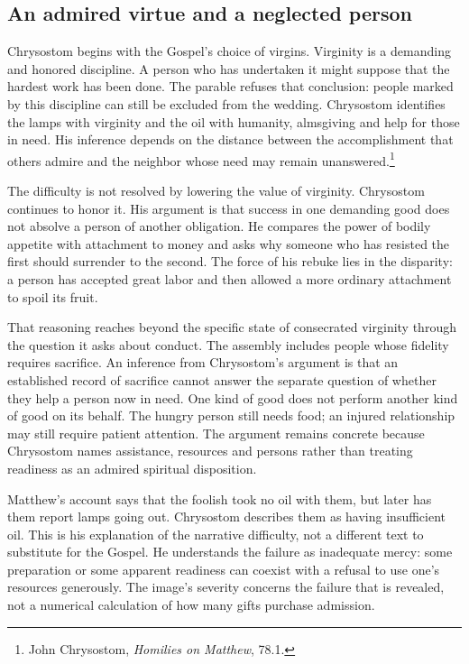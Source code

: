 \subsection{An admired virtue and a neglected person}
Chrysostom begins with the Gospel's choice of virgins. Virginity is a demanding and honored discipline. A person who has undertaken it might suppose that the hardest work has been done. The parable refuses that conclusion: people marked by this discipline can still be excluded from the wedding. Chrysostom identifies the lamps with virginity and the oil with humanity, almsgiving and help for those in need. His inference depends on the distance between the accomplishment that others admire and the neighbor whose need may remain unanswered.\footnote{John Chrysostom, \textit{Homilies on Matthew}, 78.1.}

The difficulty is not resolved by lowering the value of virginity. Chrysostom continues to honor it. His argument is that success in one demanding good does not absolve a person of another obligation. He compares the power of bodily appetite with attachment to money and asks why someone who has resisted the first should surrender to the second. The force of his rebuke lies in the disparity: a person has accepted great labor and then allowed a more ordinary attachment to spoil its fruit.

That reasoning reaches beyond the specific state of consecrated virginity through the question it asks about conduct. The assembly includes people whose fidelity requires sacrifice. An inference from Chrysostom's argument is that an established record of sacrifice cannot answer the separate question of whether they help a person now in need. One kind of good does not perform another kind of good on its behalf. The hungry person still needs food; an injured relationship may still require patient attention. The argument remains concrete because Chrysostom names assistance, resources and persons rather than treating readiness as an admired spiritual disposition.

Matthew's account says that the foolish took no oil with them, but later has them report lamps going out. Chrysostom describes them as having insufficient oil. This is his explanation of the narrative difficulty, not a different text to substitute for the Gospel. He understands the failure as inadequate mercy: some preparation or some apparent readiness can coexist with a refusal to use one's resources generously. The image's severity concerns the failure that is revealed, not a numerical calculation of how many gifts purchase admission.

